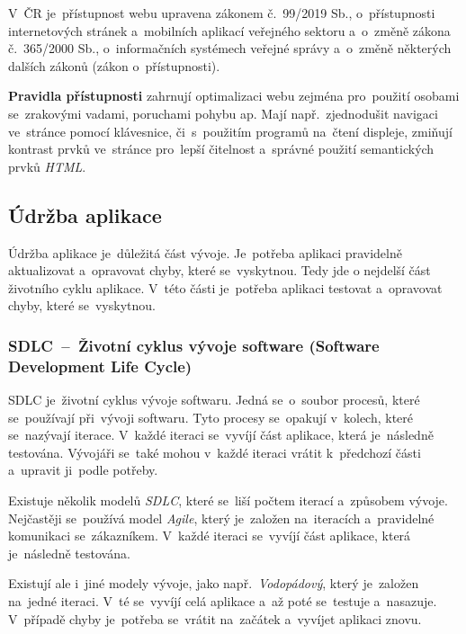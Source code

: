 \documentclass[10pt,a4paper]{article}
\begin{document}
                V~ČR je~přístupnost webu upravena zákonem č.~99/2019 Sb., o~přístupnosti internetových stránek a~mobilních aplikací veřejného sektoru a~o~změně zákona č.~365/2000 Sb., o~informačních systémech veřejné správy a~o~změně některých dalších zákonů (zákon o~přístupnosti).

                \textbf{Pravidla přístupnosti} zahrnují optimalizaci webu zejména pro~použití osobami se~zrakovými vadami, poruchami pohybu ap. Mají např.~zjednodušit navigaci ve~stránce pomocí klávesnice, či~s~použitím programů na~čtení displeje, zmiňují kontrast prvků ve~stránce pro~lepší čitelnost a~správné použití semantických prvků \emph{HTML}. \cite{w3WCAGOverview}
        \subsection{Údržba aplikace}
            Údržba aplikace je~důležitá část vývoje. Je~potřeba aplikaci pravidelně aktualizovat a~opravovat chyby, které se~vyskytnou.
            Tedy jde o nejdelší část životního cyklu aplikace. V~této části je~potřeba aplikaci testovat a~opravovat chyby, které se~vyskytnou.
            
            \subsubsection{SDLC~--~Životní cyklus vývoje software (Software Development Life Cycle)}
                SDLC je~životní cyklus vývoje softwaru. Jedná se~o~soubor procesů, které se~používají při~vývoji softwaru.
                Tyto procesy se~opakují v~kolech, které se~nazývají iterace. V~každé iteraci se~vyvíjí část aplikace, která je~následně testována.
                Vývojáři se~také mohou v~každé iteraci vrátit k~předchozí části a~upravit ji~podle potřeby.
                
                Existuje několik modelů \emph{SDLC}, které se~liší počtem iterací a~způsobem vývoje. Nejčastěji se~používá model \emph{Agile},
                který je~založen na~iteracích a~pravidelné komunikaci se~zákazníkem. V~každé iteraci se~vyvíjí část aplikace, která je~následně testována.
                
                Existují ale i~jiné modely vývoje, jako např.~\emph{Vodopádový}, který je~založen na~jedné iteraci.
                V~té se~vyvíjí celá aplikace a~až poté se~testuje a~nasazuje.
                V~případě chyby je~potřeba se~vrátit na~začátek a~vyvíjet aplikaci znovu.
\end{document}
